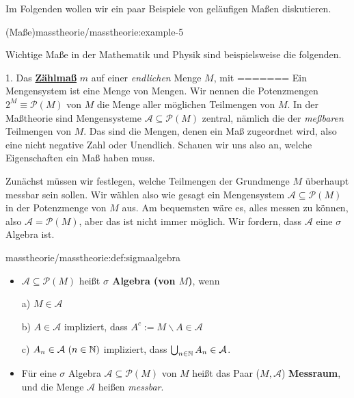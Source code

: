 \par
Im Folgenden wollen wir ein paar Beispiele von geläufigen Maßen diskutieren.
\begin{example}{(Maße)}{masstheorie/masstheorie:example-5}



\par
Wichtige Maße in der Mathematik und Physik sind beispielsweise die folgenden.

\par
1. Das \href{https://de.wikipedia.org/wiki/Z\%c3\%a4hlma\%c3\%9f\_(Ma\%c3\%9ftheorie)}{\textbf{Zählmaß}} \(m\) auf einer \emph{endlichen} Menge \(M\), mit
=======
Ein Mengensystem ist eine Menge von Mengen. Wir nennen die Potenzmengen \(2^M \equiv\mathcal{P}(M)\) von \(M\) die Menge aller möglichen Teilmengen von \(M\). In der Maßtheorie sind Mengensysteme \(\mathcal{A} \subseteq \mathcal{P}(M)\) zentral, nämlich die der \emph{meßbaren} Teilmengen von \(M\). Das sind die Mengen, denen ein Maß zugeordnet wird, also eine nicht negative Zahl oder Unendlich. Schauen wir uns also an, welche Eigenschaften ein Maß haben muss.

\par
Zunächst müssen wir festlegen, welche Teilmengen der Grundmenge \(M\) überhaupt messbar sein sollen. Wir wählen also wie gesagt ein Mengensystem \(\mathcal{A} \subseteq \mathcal{P}(M)\) in der Potenzmenge von \(M\) aus.
Am bequemsten wäre es, alles messen zu können, also \(\mathcal{A} = \mathcal{P}(M)\), aber das ist nicht immer möglich. Wir fordern, dass \(\mathcal{A}\) eine \(\sigma\) Algebra ist.
\begin{definition}{}{masstheorie/masstheorie:def:sigmaalgebra}


\begin{itemize}
\item {} 
\par
\(\mathcal{A} \subseteq \mathcal{P}(M)\) heißt \textbf{\(\sigma\) Algebra (von \(M\))}, wenn

\par
a) \(M\in \mathcal{A}\)

\par
b) \(A\in \mathcal{A}\) impliziert, dass \(A^c:=M\backslash A\in \mathcal{A}\)

\par
c) \(A_n\in \mathcal{A}\ (n\in\mathbb{N})\) impliziert, dass \(\bigcup_{n\in \mathbb{N}} A_n\in \mathcal{A}\).

\item {} 
\par
Für eine \(\sigma\) Algebra \(\mathcal{A} \subseteq \mathcal{P}(M)\) von \(M\) heißt das Paar (\(M,\mathcal{A}\)) \textbf{Messraum}, und die Menge \(\mathcal{A}\) heißen \emph{messbar}.


\end{itemize}
\end{definition}
\end{example}
